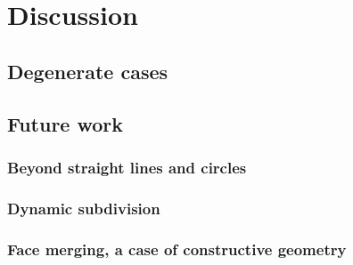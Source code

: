 \section{Discussion} \label{sec:discussion}

\subsection{Degenerate cases}
\td{}

\subsection{Future work}
\td{}

\subsubsection{Beyond straight lines and circles}
\td{}

\subsubsection{Dynamic subdivision}
\td{}


\subsubsection{Face merging, a case of constructive geometry}
\td{}
